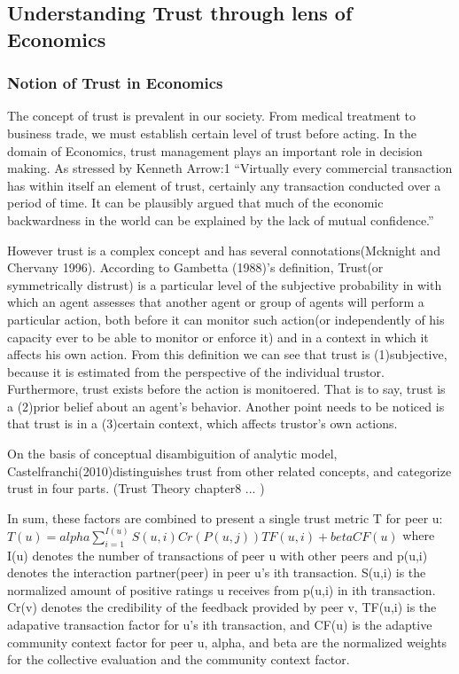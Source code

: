 \documentclass[11pt]{article}
\begin{document}
\subsection{Understanding Trust through lens of Economics}
\subsubsection{Notion of Trust in Economics}

The concept of trust is prevalent in our society. From medical treatment to business trade, we must establish certain level of trust before acting. In the domain of Economics, trust management plays an important role in decision making.  As stressed by Kenneth Arrow:1 “Virtually every commercial transaction has within itself an element of trust, certainly any transaction conducted over a period of time. It can be plausibly argued that much of the economic backwardness in the world can be explained by the lack of mutual confidence.”

However trust is a complex concept and has several connotations(Mcknight and Chervany 1996). According to Gambetta (1988)'s definition, Trust(or symmetrically distrust) is a particular level of the subjective probability in with which an agent assesses that another agent or group of agents will perform a particular action, both before it can monitor such action(or independently of his capacity ever to be able to monitor or enforce it) and in a context in which it affects his own action. From this definition we can see that trust is (1)subjective, because it is estimated from the perspective of the individual trustor. Furthermore, trust exists before the action is monitoered. That is to say, trust is a (2)prior belief about an agent's behavior. Another point needs to be noticed is that trust is in a (3)certain context, which affects trustor's own actions.

On the basis of conceptual disambiguition of analytic model, Castelfranchi(2010)distinguishes trust from other related concepts, and categorize trust in four parts. (Trust Theory chapter8 ... )

In sum, these factors are combined to present a single trust metric T for peer u:
$T(u) = alpha \sum_{i=1}^{I(u)} S(u,i) Cr(P(u,j)) TF(u,i) + beta CF(u)$
where I(u) denotes the number of transactions of peer u with other peers and p(u,i) denotes the interaction partner(peer) in peer u's ith transaction. S(u,i) is the normalized amount of positive ratings u receives from p(u,i) in ith transaction. Cr(v) denotes the credibility of the feedback provided by peer v, TF(u,i) is the adapative transaction factor for u's ith transaction, and CF(u) is the adaptive community context factor for peer u, alpha, and beta are the normalized weights for the collective evaluation and the community context factor.
\end{document}
